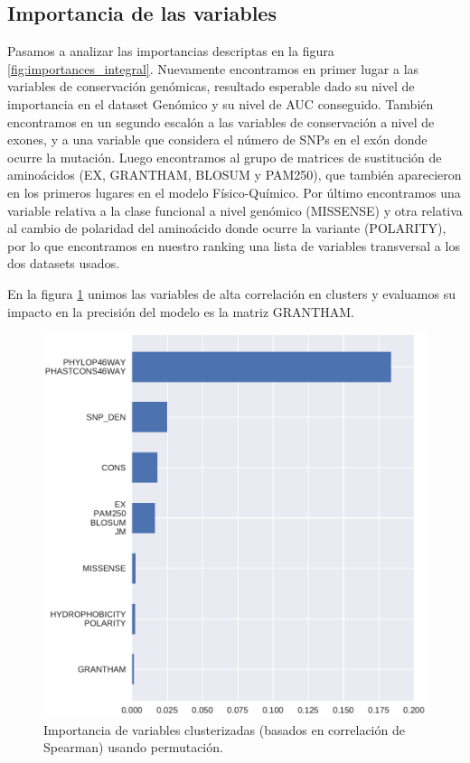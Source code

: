 \subsection{Importancia de las variables}

Pasamos a analizar las importancias descriptas en la figura \ref{fig:importances_integral}. Nuevamente encontramos en primer lugar a las variables de conservación genómicas, resultado esperable dado su nivel de importancia en el dataset Genómico y su nivel de AUC conseguido. También encontramos en un segundo escalón a las variables de conservación a nivel de exones, y a una variable que considera el número de SNPs en el exón donde ocurre la mutación. Luego encontramos al grupo de matrices de sustitución de aminoácidos (EX, GRANTHAM, BLOSUM y PAM250), que también aparecieron en los primeros lugares en el modelo Físico-Químico. Por último encontramos una variable relativa a la clase funcional a nivel genómico (MISSENSE) y otra relativa al cambio de polaridad del aminoácido donde ocurre la variante (POLARITY), por lo que encontramos en nuestro ranking una lista de variables transversal a los dos datasets usados. 

En la figura \ref{fig:importance_cluster_integral} unimos las variables de alta correlación en clusters y evaluamos su impacto en la precisión del modelo es la matriz GRANTHAM.





\begin{figure}[H]
    \centering
    \includegraphics[scale=0.6]{documents/latex/figures/3/integral/integral_importance_cluster.pdf}
    \caption{Importancia de variables clusterizadas (basados en correlación de Spearman) usando permutación.}
    \label{fig:importance_cluster_integral}
\end{figure}

